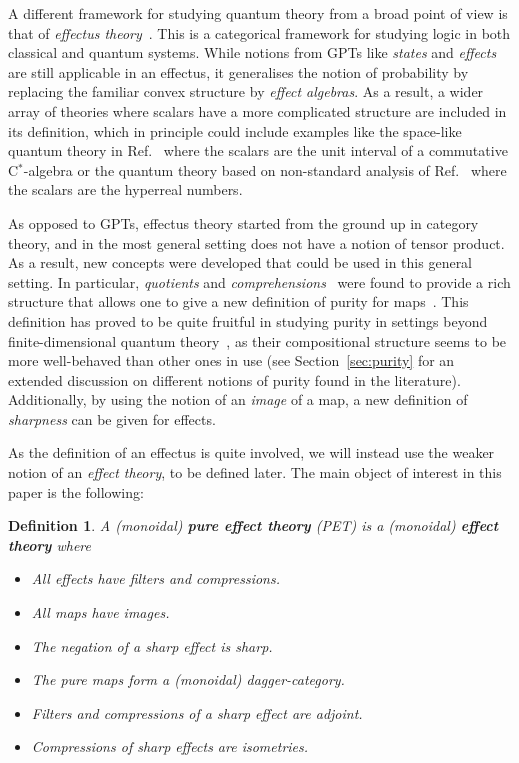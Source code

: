 \documentclass[b5paper,onecolumn,12pt,accepted=2019-05-03, issue=1, volume=1, shorttitle=papers/compositionality-1-1]{compositionalityarticle}
\numberwithin{counter}{section}
\newtheorem*{definition*}{Definition}
\begin{document}
A different framework for studying quantum theory from a broad point of view is that of \emph{effectus theory}~\cite{cho2015introduction}. This is a categorical framework for studying logic in both classical and quantum systems. While notions from GPTs like \emph{states} and \emph{effects} are still applicable in an effectus, it generalises the notion of probability by replacing the familiar convex structure by \emph{effect algebras}. As a result, a wider array of theories where scalars have a more complicated structure are included in its definition, which in principle could include examples like the space-like quantum theory in Ref.~\cite{moliner2017space} where the scalars are the unit interval of a commutative C$^*$-algebra or the quantum theory based on non-standard analysis of Ref.~\cite{gogiosotowards} where the scalars are the hyperreal numbers.

As opposed to GPTs, effectus theory started from the ground up in category theory, and in the most general setting does not have a notion of tensor product. As a result, new concepts were developed that could be used in this general setting. In particular, \emph{quotients} and \emph{comprehensions}~\cite{cho2015quotient} were found to provide a rich structure that allows one to give a new definition of purity for maps~\cite{bramthesis,basthesis}. This definition has proved to be quite fruitful in studying purity in settings beyond finite-dimensional quantum theory~\cite{westerbaan2016paschke,westerbaan2016universal,westerbaan2018puremaps}, as their compositional structure seems to be more well-behaved than other ones in use (see Section~\ref{sec:purity} for an extended discussion on different notions of purity found in the literature). 
Additionally, by using the notion of an \emph{image} of a map, a new definition of \emph{sharpness} can be given for effects.

As the definition of an effectus is quite involved, we will instead use the weaker notion of an \emph{effect theory}, to be defined later. The main object of interest in this paper is the following:

\begin{definition*}
    A (monoidal) \textbf{pure effect theory} (PET) is a (monoidal) \textbf{effect theory} where
    \begin{itemize}
        \item All effects have filters and compressions.
        \item All maps have images.
        \item The negation of a sharp effect is sharp.
        \item The pure maps form a (monoidal) dagger-category.
        \item Filters and compressions of a sharp effect are adjoint.
        \item Compressions of sharp effects are isometries.
    \end{itemize}
\end{definition*}
\end{document}
